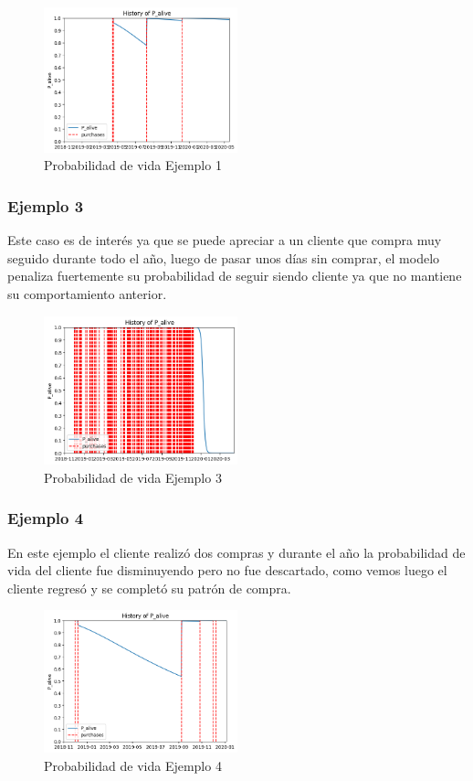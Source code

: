\begin{figure}[H]
	\centering \includegraphics[width=0.50\textwidth]{images/e1.png}
	\caption{Probabilidad de vida Ejemplo 1}
	\label{fig:e1}
\end{figure}

\subsubsection{Ejemplo 3}

Este caso es de interés ya que se puede apreciar a un cliente que compra muy seguido durante todo el año, luego de pasar unos días sin comprar, el modelo penaliza fuertemente su probabilidad de seguir siendo cliente ya que no mantiene su comportamiento anterior.

\begin{figure}[H]
	\centering \includegraphics[width=0.50\textwidth]{images/e3.png}
	\caption{Probabilidad de vida Ejemplo 3}
	\label{fig:e3}
\end{figure}

\subsubsection{Ejemplo 4}

En este ejemplo el cliente realizó dos compras y durante el año la probabilidad de vida del cliente fue disminuyendo pero no fue descartado, como vemos luego el cliente regresó y se completó su patrón de compra.

\begin{figure}[H]
	\centering \includegraphics[width=0.50\textwidth]{images/e4.png}
	\caption{Probabilidad de vida Ejemplo 4}
	\label{fig:e4}
\end{figure}

